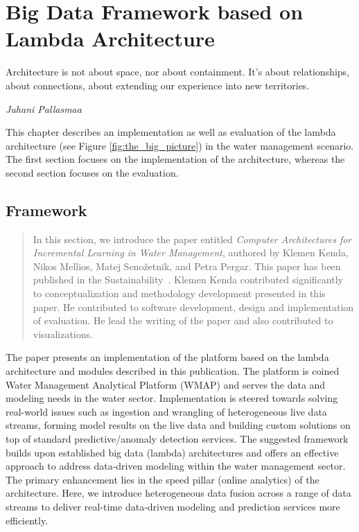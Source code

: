 % 
\chapter{Big Data Framework based on Lambda Architecture}
\label{ch:big_data_framework}

\epigraph{Architecture is not about space, nor about containment. It's about relationships, about connections, about extending our experience into new territories.}{\textit{Juhani Pallasmaa}}

This chapter describes an implementation as well as evaluation of the lambda architecture (see Figure \ref{fig:the_big_picture}) in the water management scenario.
The first section focuses on the implementation of the architecture, whereas the second section focuses on the evaluation.

\section{Framework}

\begin{quote}
In this section, we introduce the paper entitled \textit{Computer Architectures for Incremental Learning in Water Management}, authored by Klemen Kenda, Nikos Mellios, Matej Senožetnik, and Petra Pergar. 
This paper has been published in the Sustainability~\cite{kenda:2022:water-framework}.
Klemen Kenda contributed significantly to conceptualization and methodology development presented in this paper. 
He contributed to software development, design and implementation of evaluation.
He lead the writing of the paper and also contributed to visualizations.
\end{quote}

The paper presents an implementation of the platform based on the lambda architecture and modules described in this publication.
The platform is coined Water Management Analytical Platform (WMAP) and serves the data and modeling needs in the water sector.
Implementation is steered towards solving real-world issues such as ingestion and wrangling of heterogeneous live data streams, forming model results on the live data and building custom solutions on top of standard predictive/anomaly detection services.
The suggested framework builds upon established big data (lambda) architectures and offers an effective approach to address data-driven modeling within the water management sector. 
The primary enhancement lies in the speed pillar (online analytics) of the architecture. 
Here, we introduce heterogeneous data fusion across a range of data streams to deliver real-time data-driven modeling and prediction services more efficiently.

